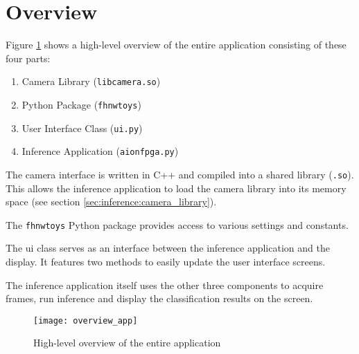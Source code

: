 \section{Overview}
\label{sec:inference:overview}

Figure \ref{fig:overview_app} shows a high-level overview of the entire application consisting of these four parts:
\begin{enumerate}
  \item Camera Library (\texttt{libcamera.so})
  \item Python Package (\texttt{fhnwtoys})
  \item User Interface Class (\texttt{ui.py})
  \item Inference Application (\texttt{aionfpga.py})
\end{enumerate}


The camera interface is written in C++ and compiled into a shared library (\texttt{.so}).
This allows the inference application to load the camera library into its memory space (see section \ref{sec:inference:camera_library}).

The \texttt{fhnwtoys} Python package provides access to various settings and constants.

The \acrlong{ui} class serves as an interface between the inference application and the display.
It features two methods to easily update the user interface screens.

The inference application itself uses the other three components to acquire frames, run inference and display the classification results on the screen.

\begin{figure}
  \centering
  \texttt{[image: overview\_app]}
  \caption{High-level overview of the entire application}
  \label{fig:overview_app}
\end{figure}
